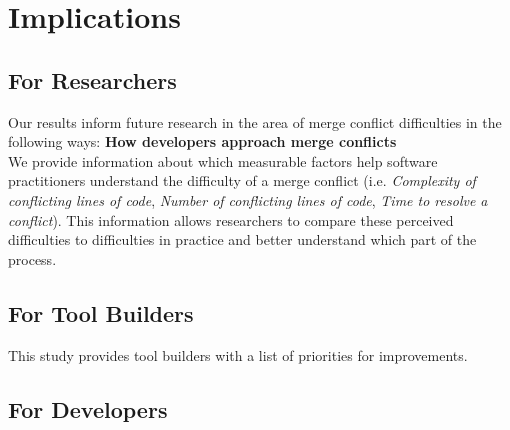 \section{Implications}\label{implications}
\subsection{For Researchers}
Our results inform future research in the area of merge conflict difficulties in the following ways:
\textbf{How developers approach merge conflicts}\\
We provide information about which measurable factors help software practitioners understand the difficulty of a merge conflict (i.e. \textit{Complexity of conflicting lines of code}, \textit{Number of conflicting lines of code}, \textit{Time to resolve a conflict}). This information allows researchers to compare these perceived difficulties to difficulties in practice and better understand which part of the process.
\subsection{For Tool Builders}
This study provides tool builders with a list of priorities for improvements. 
\subsection{For Developers}